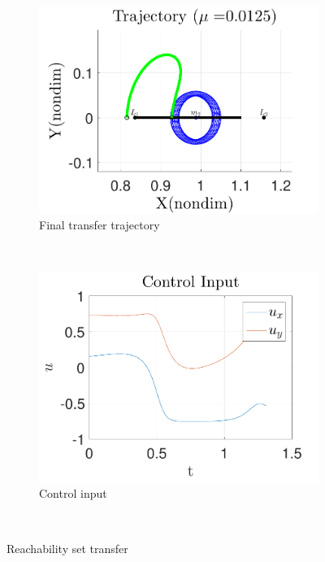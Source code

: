 \documentclass[smallcondensed]{svjour3}
\begin{document}
\begin{figure}
        \begin{subfigure}[htbp]{0.5\textwidth} 
                \includegraphics[width=\textwidth]{reach_transfer} 
                \caption{Final transfer trajectory} \label{fig:reach_transfer} 
        \end{subfigure}~ 
        \begin{subfigure}[htbp]{0.5\textwidth} 
                \includegraphics[width=\textwidth]{control_input_l1} 
                \caption{Control input} \label{fig:control_l1} 
        \end{subfigure}~
        \caption{Reachability set transfer}
        \label{fig:reachability_set_transfer} 
\end{figure}
\end{document}
